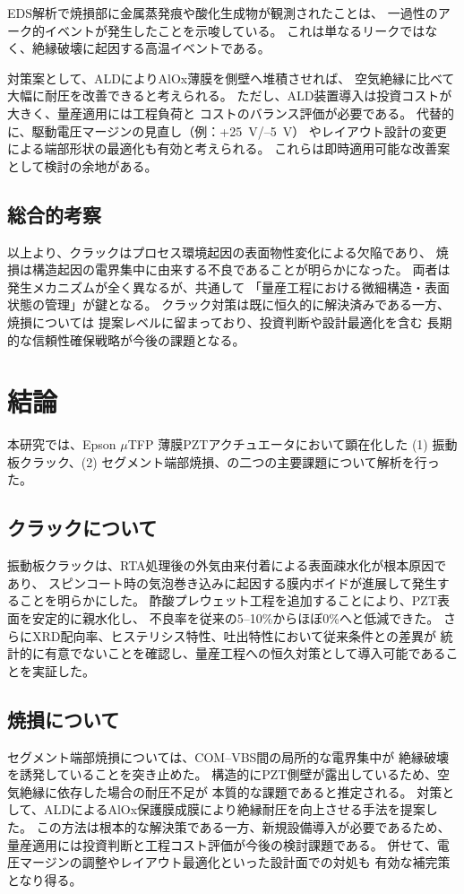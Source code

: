 \documentclass[conference]{IEEEtran}
\begin{document}
EDS解析で焼損部に金属蒸発痕や酸化生成物が観測されたことは、
一過性のアーク的イベントが発生したことを示唆している。
これは単なるリークではなく、絶縁破壊に起因する高温イベントである。

対策案として、ALDによりAlOx薄膜を側壁へ堆積させれば、
空気絶縁に比べて大幅に耐圧を改善できると考えられる。
ただし、ALD装置導入は投資コストが大きく、量産適用には工程負荷と
コストのバランス評価が必要である。
代替的に、駆動電圧マージンの見直し（例：+\SI{25}{V}/--\SI{5}{V}）
やレイアウト設計の変更による端部形状の最適化も有効と考えられる。
これらは即時適用可能な改善案として検討の余地がある。

\subsection{総合的考察}
以上より、クラックはプロセス環境起因の表面物性変化による欠陥であり、
焼損は構造起因の電界集中に由来する不良であることが明らかになった。
両者は発生メカニズムが全く異なるが、共通して
「量産工程における微細構造・表面状態の管理」が鍵となる。
クラック対策は既に恒久的に解決済みである一方、焼損については
提案レベルに留まっており、投資判断や設計最適化を含む
長期的な信頼性確保戦略が今後の課題となる。

\section{結論}
本研究では、Epson $\mu$TFP 薄膜PZTアクチュエータにおいて顕在化した
(1) 振動板クラック、(2) セグメント端部焼損、の二つの主要課題について解析を行った。

\subsection{クラックについて}
振動板クラックは、RTA処理後の外気由来付着による表面疎水化が根本原因であり、
スピンコート時の気泡巻き込みに起因する膜内ボイドが進展して発生することを明らかにした。
酢酸プレウェット工程を追加することにより、PZT表面を安定的に親水化し、
不良率を従来の5--10\%からほぼ0\%へと低減できた。
さらにXRD配向率、ヒステリシス特性、吐出特性において従来条件との差異が
統計的に有意でないことを確認し、量産工程への恒久対策として導入可能であることを実証した。

\subsection{焼損について}
セグメント端部焼損については、COM--VBS間の局所的な電界集中が
絶縁破壊を誘発していることを突き止めた。
構造的にPZT側壁が露出しているため、空気絶縁に依存した場合の耐圧不足が
本質的な課題であると推定される。
対策として、ALDによるAlOx保護膜成膜により絶縁耐圧を向上させる手法を提案した。
この方法は根本的な解決策である一方、新規設備導入が必要であるため、
量産適用には投資判断と工程コスト評価が今後の検討課題である。
併せて、電圧マージンの調整やレイアウト最適化といった設計面での対処も
有効な補完策となり得る。
\end{document}
